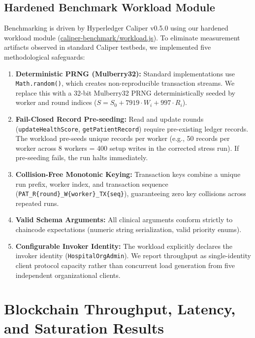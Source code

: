 \documentclass[runningheads]{llncs}
\begin{document}
\subsection{Hardened Benchmark Workload Module}
Benchmarking is driven by Hyperledger Caliper v0.5.0 using our hardened workload module (\url{caliper-benchmark/workload.js}). To eliminate measurement artifacts observed in standard Caliper testbeds, we implemented five methodological safeguards:
\begin{enumerate}
    \item \textbf{Deterministic PRNG (Mulberry32):} Standard implementations use \texttt{Math.random()}, which creates non-reproducible transaction streams. We replace this with a 32-bit Mulberry32 PRNG deterministically seeded by worker and round indices ($S = S_0 + 7919 \cdot W_i + 997 \cdot R_i$).
    \item \textbf{Fail-Closed Record Pre-seeding:} Read and update rounds (\texttt{updateHealthScore}, \texttt{getPatientRecord}) require pre-existing ledger records. The workload pre-seeds unique records per worker (e.g., 50 records per worker across 8 workers = 400 setup writes in the corrected stress run). If pre-seeding fails, the run halts immediately.
    \item \textbf{Collision-Free Monotonic Keying:} Transaction keys combine a unique run prefix, worker index, and transaction sequence (\texttt{PAT\_R\{round\}\_W\{worker\}\_TX\{seq\}}), guaranteeing zero key collisions across repeated runs.
    \item \textbf{Valid Schema Arguments:} All clinical arguments conform strictly to chaincode expectations (numeric string serialization, valid priority enums).
    \item \textbf{Configurable Invoker Identity:} The workload explicitly declares the invoker identity (\texttt{HospitalOrgAdmin}). We report throughput as single-identity client protocol capacity rather than concurrent load generation from five independent organizational clients.
\end{enumerate}

\section{Blockchain Throughput, Latency, and Saturation Results}
\end{document}

